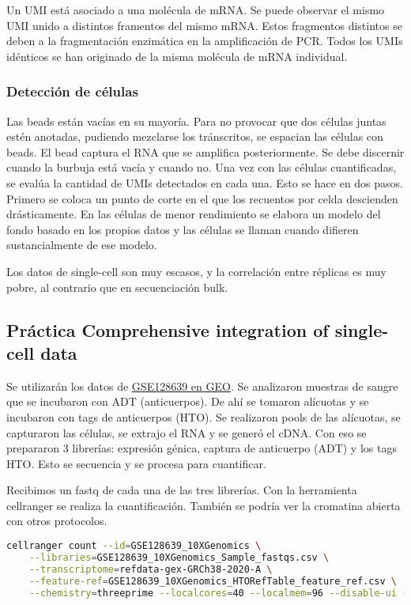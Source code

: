 Un UMI está asociado a una molécula de mRNA. Se puede observar el mismo UMI unido a distintos framentos del mismo mRNA. Estos fragmentos distintos se deben a la fragmentación enzimática en la amplificación de PCR. Todos los UMIs idénticos se han originado de la misma molécula de mRNA individual.

\subsubsection{Detección de células}
Las beads están vacías en su mayoría. Para no provocar que dos células juntas estén anotadas, pudiendo mezclarse los tránscritos, se espacian las células con beads. El bead captura el RNA que se amplifica posteriormente. Se debe discernir cuando la burbuja está vacía y cuando no. Una vez con las células cuantificadas, se evalúa la cantidad de UMIs detectados en cada una. Esto se hace en dos pasos. Primero se coloca un punto de corte en el que los recuentos por celda descienden drásticamente. En las células de menor rendimiento se elabora un modelo del fondo basado en los propios datos y las células se llaman cuando difieren sustancialmente de ese modelo. 

Los datos de single-cell son muy escasos, y la correlación entre réplicas es muy pobre, al contrario que en secuenciación bulk. 

\subsection{Práctica Comprehensive integration of single-cell data}
Se utilizarán los datos de \href{https://www.ncbi.nlm.nih.gov/geo/query/acc.cgi?acc=GSE128639}{GSE128639 en GEO}. Se analizaron muestras de sangre que se incubaron con ADT (anticuerpos). De ahí se tomaron alícuotas y se incubaron con tags de anticuerpos (HTO). Se realizaron pools de las alícuotas, se capturaron las células, se extrajo el RNA y se generó el cDNA. Con eso se prepararon 3 librerías: expresión génica, captura de anticuerpo (ADT) y los tags HTO. Esto se secuencia y se procesa para cuantificar.

Recibimos un fastq de cada una de las tres librerías. Con la herramienta cellranger se realiza la cuantificación. También se podría ver la cromatina abierta con otros protocolos. 

\begin{lstlisting}[language=bash]
cellranger count --id=GSE128639_10XGenomics \
	--libraries=GSE128639_10XGenomics_Sample_fastqs.csv \
	--transcriptome=refdata-gex-GRCh38-2020-A \
	--feature-ref=GSE128639_10XGenomics_HTORefTable_feature_ref.csv \
	--chemistry=threeprime --localcores=40 --localmem=96 --disable-ui --nosecondary --no-bam
\end{lstlisting}

